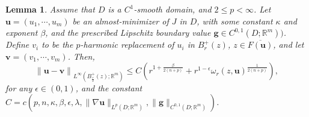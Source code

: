 \documentclass{amsart}
\newtheorem{lemma}[theorem]{Lemma}
\begin{document}
\begin{lemma} 
\label{S-4-B-01}
Assume that $D$ is a $C^1$-smooth domain, and $2\le p<\infty$. Let $\mathbf{u}=(u_1, \cdots, u_m)$ be an almost-minimizer of $J$ in $D$, with some constant $\kappa$ and exponent $\beta$, and the prescribed Lipschitz boundary value $\mathbf{g}\in C^{0,1}(D;\mathbb{R}^m))$. 
Define $v_i$ to be the $p$-harmonic replacement of ${u_i}$ in $B_r^+(z)$, $z \in \overline{F(\mathbf{u})}$, and let $\mathbf{v}=(v_1, \cdots, v_m)$. Then,
\begin{equation}
\label{S-4-B-02}
\left\| \mathbf{u}  - \mathbf{v} \right\|_{L^{\infty}(B_{\frac{r}{2}}^+(z); \mathbb{R}^m )} \leq C \left( r^{1+\frac{\beta}{2(n+p)}} + r^{1-\epsilon} \omega_r(z,\mathbf{u})^{\frac{1}{2(n+p)}} \right),
\end{equation}
for any $\epsilon \in (0,1)$, and the constant $C=c(p, n, \kappa, \beta, \epsilon ,\lambda, \| \nabla \mathbf{u} \|_{L^p(D; \mathbb{R}^m)}, \| \mathbf{g} \|_{C^{0,1}(D;\mathbb{R}^m)})$.
\end{lemma}
\end{document}
